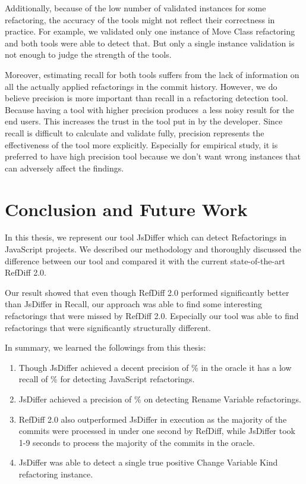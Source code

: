 \documentclass[letterpaper,12pt,onecolumn,final]{report}
\begin{document}
Additionally, because of the low number of validated instances for some refactoring, the accuracy of the tools might not reflect their correctness in practice. For example, we validated only one instance of Move Class refactoring and both tools were able to detect that. But only a single instance validation is not enough to judge the strength of the tools.

Moreover, estimating recall for both tools suffers from the lack of information on all the actually applied refactorings in the commit history. However, we do believe precision is more important than recall in a refactoring detection tool. Because having a tool with higher precision produces a less noisy result for the end users. This increases the trust in the tool put in by the developer. Since recall is difficult to calculate and validate fully, precision represents the effectiveness of the tool more explicitly. Especially for empirical study, it is preferred to have high precision tool because we don't want wrong instances that can adversely affect the findings.

\chapter{Conclusion and Future Work}
\label{chap:conclusion}

In this thesis, we represent our tool JsDiffer which can detect Refactorings in JavaScript projects. We described our methodology and thoroughly discussed the difference between our tool and compared it with the current state-of-the-art RefDiff 2.0.

Our result showed that even though RefDiff 2.0 performed significantly better than JsDiffer in Recall, our approach was able to find some interesting refactorings that were missed by RefDiff 2.0. Especially our tool was able to find refactorings that were significantly structurally different.


In summary, we learned the followings from this thesis:
\begin{enumerate}
\item Though JsDiffer achieved a decent precision of \rmOverallPrecision{}\% in the oracle it has a low recall of \rmOverallRecall{}\%    for detecting JavaScript refactorings. 
\item JsDiffer achieved a precision of \renameVarPrecision{}\% on detecting Rename Variable refactorings.
\item RefDiff 2.0 also outperformed JsDiffer in execution as the majority of the commits were processed in under one second by RefDiff, while JsDiffer took 1-9 seconds to process the majority of the commits in the oracle.
\item JsDiffer was able to detect a single true positive Change Variable Kind refactoring instance.
\end{enumerate}
\end{document}

